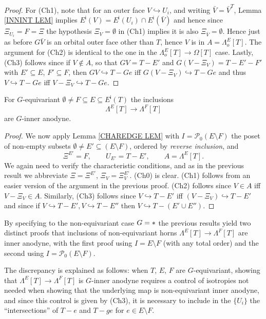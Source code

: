 \documentclass[a4paper,10pt
,draft
]{article}%
\begin{document}
\begin{proof}
For (Ch1), note that for an outer face 
$V \hookrightarrow U_i$, and writing $\bar{V} = \bar{V}^T$,
Lemma \ref{INNINT LEM} implies
$E^{\mathsf{i}}(V) = E^{\mathsf{i}}(U_i) \cap E^{\mathsf{i}}(\bar{V})$
and hence since $\Xi_{U_i} = F = \Xi$ the 
hypothesis $\Xi_{V} = \emptyset$ in (Ch1) implies it is also
$\Xi_{\bar{V}} = \emptyset$.
Hence just as before $G\bar{V}$ is an orbital outer face other than $T$, hence $V$ is in $A=\Lambda_o^{E}[T]$.
The argument for (Ch2) is identical to the one in the
$\Lambda_o^{E}[T] \to \Omega[T]$ case.
Lastly, (Ch3) follows since	if $V \not \in A$, so that
$GV = T - E'$ and $G(V - \Xi_V) = T-E'-F'$ with
$E' \subseteq E$, $F' \subseteq F$,
then $GV \hookrightarrow T-Ge$ iff $G(V - \Xi_V) \hookrightarrow T-Ge$
and thus $V \hookrightarrow T-Ge$ iff $V - \Xi_V \hookrightarrow T-Ge$.
\end{proof}


\begin{proposition}\label{REG_HORN_PROP}
For $G$-equivariant 
$\emptyset \neq F \subseteq E \subseteq E^{\mathsf{i}}(T)$
the inclusions
\begin{equation}
	\Lambda^{E}[T] \to \Lambda^{F}[T]
\end{equation}
are $G$-inner anodyne.
\end{proposition}

\begin{proof}
We now apply Lemma \ref{CHAREDGE LEM} with 
$I = \mathcal{P}_0(E\setminus F)$
the poset of non-empty subsets $\emptyset \neq E' \subseteq (E \setminus F)$, ordered by \textit{reverse inclusion}, and
\[
	\Xi^{E'} = F, \qquad
	U_{E'} = T - E', \qquad
	A=\Lambda^{E}[T].
\]
We again need to verify the characteristic conditions,
and as in the previous result we abbreviate
$\Xi = \Xi^{E'}$, $\Xi_V = \Xi^{E'}_V$.
(Ch0) is clear. (Ch1) follows from an easier version of the argument in the previous proof.
(Ch2) follows since $V \in A$ iff $V-\Xi_V \in A$.
Similarly,
(Ch3) follows since 
$V \hookrightarrow T-E'$ iff $(V-\Xi_V) \hookrightarrow T-E'$
and since if
$V \hookrightarrow T-E',V \hookrightarrow T-E''$
then 
$V \hookrightarrow T-(E' \cup E'')$.
\end{proof}


\begin{remark}\label{TWOPROOF REM}
	By specifying to the non-equivariant case $G = \**$
	the previous results yield two distinct proofs
	that inclusions of non-equivariant horns
	$\Lambda^{E}[T] \to \Lambda^{F}[T]$
	are inner anodyne,
	with the first proof using $I = E \setminus F$ (with any total order) and the second using 
	$I = \mathcal{P}_0(E \setminus F)$. 

	The discrepancy is explained as follows: 
	when $T$, $E$, $F$ are $G$-equivariant, showing that
	$\Lambda^{E}[T] \to \Lambda^{F}[T]$ 
	is $G$-inner anodyne requires a control of isotropies 
	not needed when showing that the underlying map is non-equivariant inner anodyne, and since this control is given by (Ch3), it is necessary to include in the $\{U_i\}$ the
	``intersections'' of $T-e$ and $T-ge$ for $e \in E \setminus F$. 
\end{remark}
\end{document}
